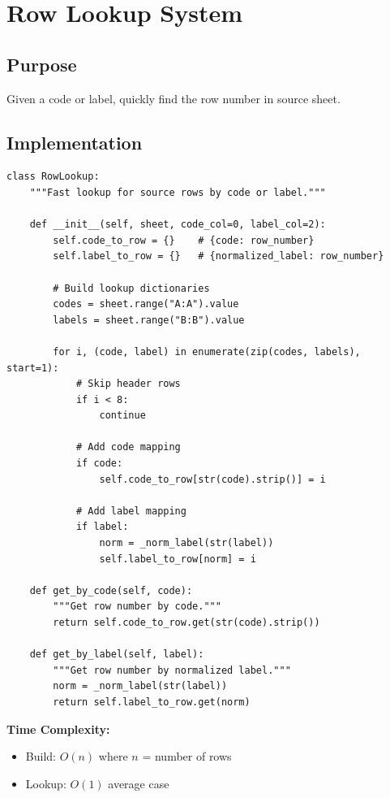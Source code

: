 \section{Row Lookup System}

\subsection{Purpose}

Given a code or label, quickly find the row number in source sheet.

\subsection{Implementation}

\begin{lstlisting}[style=pythonstyle]
class RowLookup:
    """Fast lookup for source rows by code or label."""
    
    def __init__(self, sheet, code_col=0, label_col=2):
        self.code_to_row = {}    # {code: row_number}
        self.label_to_row = {}   # {normalized_label: row_number}
        
        # Build lookup dictionaries
        codes = sheet.range("A:A").value
        labels = sheet.range("B:B").value
        
        for i, (code, label) in enumerate(zip(codes, labels), start=1):
            # Skip header rows
            if i < 8:
                continue
            
            # Add code mapping
            if code:
                self.code_to_row[str(code).strip()] = i
            
            # Add label mapping
            if label:
                norm = _norm_label(str(label))
                self.label_to_row[norm] = i
    
    def get_by_code(self, code):
        """Get row number by code."""
        return self.code_to_row.get(str(code).strip())
    
    def get_by_label(self, label):
        """Get row number by normalized label."""
        norm = _norm_label(str(label))
        return self.label_to_row.get(norm)
\end{lstlisting}

\textbf{Time Complexity:}
\begin{itemize}
    \item Build: $O(n)$ where $n$ = number of rows
    \item Lookup: $O(1)$ average case
\end{itemize}

